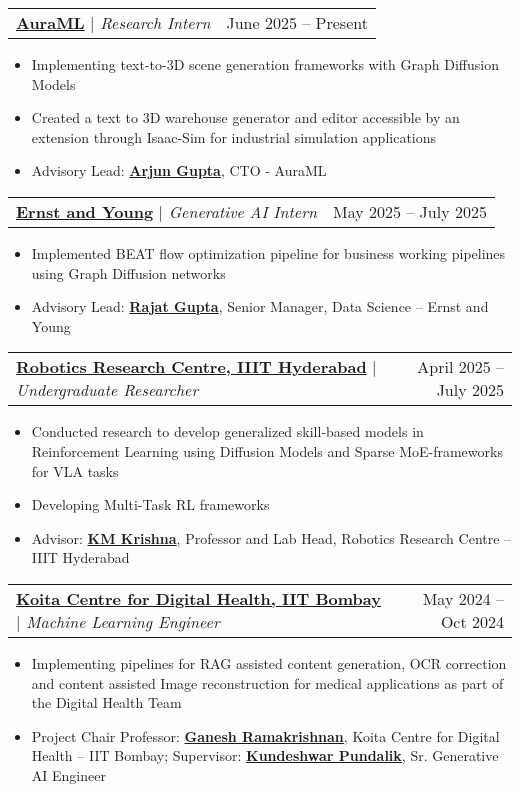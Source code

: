 \documentclass[letterpaper,11pt]{article}
\makeatletter
\newcommand{\resumeItem}[1]{
  \item\small{
    {#1 \vspace{-2pt}}
  }
}
\newcommand{\resumeProjectHeading}[2]{
    \item
    \begin{tabular*}{0.97\textwidth}{l@{\extracolsep{\fill}}r}
      \small#1 & \small#2 \\
    \end{tabular*}\vspace{-7pt}
}
\newcommand{\resumeItemListStart}{\begin{itemize}}
\newcommand{\resumeItemListEnd}{\end{itemize}\vspace{-9pt}}
\makeatother
\begin{document}
    \resumeProjectHeading
          {\href{https://www.auraml.com/}{\textbf{AuraML}} \emph{$|$ Research Intern}}
          {\hfill June 2025 -- Present}
          \resumeItemListStart
            \resumeItem{Implementing text-to-3D scene generation frameworks with Graph Diffusion Models}
            \resumeItem{Created a text to 3D warehouse generator and editor accessible by an extension through Isaac-Sim for industrial simulation applications}
            \resumeItem{Advisory Lead: \href{https://www.forbes.com/profile/arjun-gupta/}{\textbf{Arjun Gupta}}, CTO - AuraML}
          \resumeItemListEnd


    \resumeProjectHeading
          {\href{https://www.ey.com/en_in}{\textbf{Ernst and Young}} \emph{$|$ Generative AI Intern}}
          {\hfill May 2025 -- July 2025}
          \resumeItemListStart
            \resumeItem{Implemented BEAT flow optimization pipeline for business working pipelines using Graph Diffusion networks}
            \resumeItem{Advisory Lead: \href{https://in.linkedin.com/in/rajat-gupta-1110}{\textbf{Rajat Gupta}}, Senior Manager, Data Science – Ernst and Young}
          \resumeItemListEnd

    \resumeProjectHeading
          {\href{https://robotics.iiit.ac.in/}{\textbf{Robotics Research Centre, IIIT Hyderabad}} \emph{$|$ Undergraduate Researcher}}
          {\hfill April 2025 -- July 2025}
          \resumeItemListStart
            \resumeItem{Conducted research to develop generalized skill-based models in Reinforcement Learning using Diffusion Models and Sparse MoE-frameworks for VLA tasks}
            \resumeItem{Developing Multi-Task RL frameworks}
            \resumeItem{Advisor: \href{https://robotics.iiit.ac.in/faculty_mkrishna/}{\textbf{KM Krishna}}, Professor and Lab Head, Robotics Research Centre – IIIT Hyderabad}
          \resumeItemListEnd
          

          
      \resumeProjectHeading
          {\href{https://www.kcdh.iitb.ac.in/}{\textbf{Koita Centre for Digital Health, IIT Bombay}} \emph{$|$ Machine Learning Engineer}}
          {\hfill  May 2024 -- Oct 2024}
          \resumeItemListStart
            \resumeItem{Implementing pipelines for RAG assisted content generation, OCR correction and content assisted Image reconstruction for medical applications as part of the Digital Health Team}

            \resumeItem{Project Chair Professor: \href{https://www.cse.iitb.ac.in/~ganesh/}{\textbf{Ganesh Ramakrishnan}}, Koita Centre for Digital Health – IIT Bombay; Supervisor: \href{https://www.linkedin.com/in/kundeshwar/?originalSubdomain=in}{\textbf{Kundeshwar Pundalik}}, Sr. Generative AI Engineer}
          \resumeItemListEnd
\end{document}
